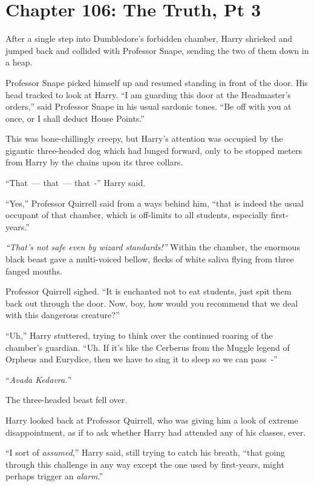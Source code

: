\chapter{Chapter 106: The Truth, Pt 3}
After a single step into Dumbledore's forbidden chamber, Harry shrieked and jumped back and collided with Professor Snape, sending the two of them down in a heap.

Professor Snape picked himself up and resumed standing in front of the door. His head tracked to look at Harry. ``I am guarding this door at the Headmaster's orders,'' said Professor Snape in his usual sardonic tones. ``Be off with you at once, or I shall deduct House Points.''

This was bone-chillingly creepy, but Harry's attention was occupied by the gigantic three-headed dog which had lunged forward, only to be stopped meters from Harry by the chains upon its three collars.

``That~--- that~--- that~-'' Harry said.

``Yes,'' Professor Quirrell said from a ways behind him, ``that is indeed the usual occupant of that chamber, which is off-limits to all students, especially first-years.''

\emph{``That's not safe even by wizard standards!''} Within the chamber, the enormous black beast gave a multi-voiced bellow, flecks of white saliva flying from three fanged mouths.

Professor Quirrell sighed. ``It is enchanted not to eat students, just spit them back out through the door. Now, boy, how would you recommend that we deal with this dangerous creature?''

``Uh,'' Harry stuttered, trying to think over the continued roaring of the chamber's guardian. ``Uh. If it's like the Cerberus from the Muggle legend of Orpheus and Eurydice, then we have to sing it to sleep so we can pass~-''

``\emph{Avada Kedavra.}''

The three-headed beast fell over.

Harry looked back at Professor Quirrell, who was giving him a look of extreme disappointment, as if to ask whether Harry had attended any of his classes, ever.

``I sort of \emph{assumed},'' Harry said, still trying to catch his breath, ``that going through this challenge in any way except the one used by first-years, might perhaps trigger an \emph{alarm}.''

